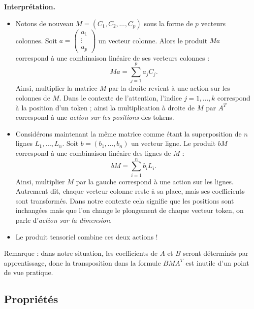 \documentclass[11pt,class=report,crop=false]{standalone}
\begin{document}
\bigskip

\textbf{Interprétation.}

\begin{itemize}
	\item Notons de nouveau $M = (C_1, C_2, \ldots, C_p)$ sous la forme de $p$ vecteurs colonnes.
	Soit $a = \left(\begin{smallmatrix} a_1 \\ \vdots \\ a_p \end{smallmatrix}\right)$ un vecteur colonne. Alors le produit $Ma$ correspond à une combinaison linéaire de ses vecteurs colonnes :
	$$ Ma = \sum_{j = 1}^p a_j C_j.$$
	Ainsi, multiplier la matrice $M$ par la droite revient à une action sur les colonnes de $M$.
	Dans le contexte de l'attention, l'indice $j=1,\ldots,k$ correspond à  la position d'un token ; 
	ainsi la multiplication à droite de $M$ par $A^T$ correspond à une \emph{action sur les positions} des tokens.
		
	\item Considérons maintenant la même matrice comme étant la superposition de $n$ lignes $L_1,\ldots,L_n$.
	Soit $b = (b_1,\ldots,b_n)$ un vecteur ligne. Le produit $bM$ correspond à une combinaison linéaire des lignes de $M$ :
	$$bM = \sum_{i=1}^{n} b_i L_i.$$
	Ainsi, multiplier $M$ par la gauche correspond à une action sur les lignes.
	Autrement dit, chaque vecteur colonne reste à sa place, mais ses coefficients sont transformés.
	Dans notre contexte cela signifie que les positions sont inchangées mais que l'on change le plongement de chaque vecteur token, on parle d'\emph{action sur la dimension}.
	
	\item Le produit tensoriel combine ces deux actions !
	
\end{itemize}

Remarque : dans notre situation, les coefficients de $A$ et $B$ seront déterminés par apprentissage, donc la transposition dans la formule $B M A^T$ est inutile d'un point de vue pratique.

\subsection{Propriétés}
\end{document}
